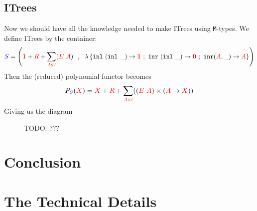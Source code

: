 \documentclass[twoside,11pt,openright]{report}
\newcommand*{\term}[1]{\textcolor{green!70!black}{#1}}
\newcommand*{\type}[1]{\textcolor{red}{#1}}
\newcommand*{\container}[1]{\textcolor{blue}{#1}}
\newcommand*{\universe}[1]{\textcolor{orange}{#1}}
\newcommand*{\unit}{\type{\textbf{1}}}
\newcommand*{\empt}{\type{\textbf{0}}}
\begin{document}
\section{ITrees}
Now we should have all the knowledge needed to make ITrees using \texttt{M}-types. We define ITrees by the container:
\begin{equation}
  \container{S} = \left( \unit+\type{R}+\sum_{\type{A}:\universe{\mathcal{U}}} (\type{E}~\type{A}) ~~,~~ \lambda\left\{ \texttt{inl}~(\texttt{inl}~\_) \rightarrow \unit ~;~ \texttt{inr}~(\texttt{inl}~\_) \rightarrow \empt ~;~ \texttt{inr} (\type{A},\_)  \rightarrow \type{A} \right\} \right)
\end{equation}
Then the (reduced) polynomial functor becomes
\begin{equation}
  P_{\container{S}}(\type{X}) = \type{X} + \type{R} + \sum_{\type{A} : \universe{\mathcal{U}}} ((\type{E}~\type{A}) \times (\type{A} \rightarrow \type{X}))
\end{equation}
Giving us the diagram
\begin{figure}[h]
  \centering
  \caption{TODO: ???}
\end{figure}


\chapter{Conclusion}
\label{ch:conclusion}



\cleardoublepage
{}
 



\cleardoublepage
\appendix
\chapter{The Technical Details}

\todo[inline]{\dots}
\end{document}
